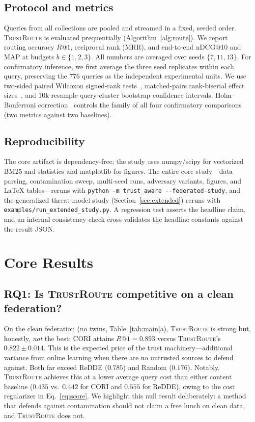 \documentclass[preprint,12pt]{elsarticle}
\newcommand{\system}{\textsc{TrustRoute}}
\begin{document}
\subsection{Protocol and metrics}
Queries from all collections are pooled and streamed in a fixed, seeded order.
\system{} is evaluated prequentially (Algorithm~\ref{alg:route}). We report
routing accuracy $R@1$, reciprocal rank (MRR), and end-to-end nDCG@10 and MAP at
budgets $b\in\{1,2,3\}$. All numbers are averaged over seeds $\{7,11,13\}$. For
confirmatory inference, we first average the three seed replicates within each
query, preserving the 776 queries as the independent experimental units. We use
two-sided paired Wilcoxon signed-rank tests~\cite{wilcoxon1945individual},
matched-pairs rank-biserial effect sizes~\cite{cliff1993delta}, and
10k-resample query-cluster bootstrap confidence intervals. Holm--Bonferroni
correction~\cite{holm1979simple} controls the family of all four confirmatory
comparisons (two metrics against two baselines).

\subsection{Reproducibility}
The core artifact is dependency-free; the study uses numpy/scipy for vectorized
BM25 and statistics and matplotlib for figures. The entire core study---data
parsing, contamination sweep, multi-seed runs, adversary variants, figures, and
\LaTeX{} tables---reruns with \texttt{python -m trust\_aware
-{}-federated-study}, and the generalized threat-model study
(Section~\ref{sec:extended}) reruns with \texttt{examples/run\_extended\_study.py}.
A regression test asserts the headline claim, and an internal consistency check
cross-validates the headline constants against the result JSON.

\section{Core Results}\label{sec:results}

\subsection{RQ1: Is \system{} competitive on a clean federation?}
On the clean federation (no twins, Table~\ref{tab:main}a), \system{} is strong
but, honestly, \emph{not} the best: CORI attains $R@1=0.893$ versus \system's
$0.822\pm0.014$. This is the expected price of the trust machinery---additional
variance from online learning when there are no untrusted sources to defend
against. Both far exceed ReDDE ($0.785$) and Random ($0.176$). Notably, \system{}
achieves this at a lower average query cost than either content baseline
($0.435$ vs.\ $0.442$ for CORI and $0.555$ for ReDDE), owing to the cost
regularizer in Eq.~\eqref{eq:score}. We highlight this null
result deliberately: a method that defends against contamination should not claim
a free lunch on clean data, and \system{} does not.
\end{document}
